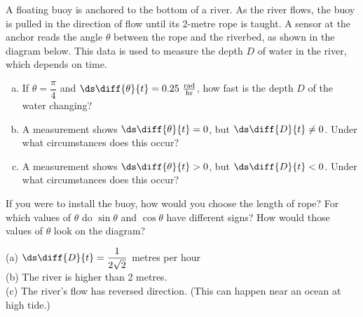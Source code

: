 \begin{Mquestion}
A floating buoy is anchored to the bottom of a river. As the river flows, the buoy is pulled in the direction of flow until its 2-metre rope is taught. A sensor at the anchor reads the angle $\theta$ between the rope and the riverbed, as shown in the diagram below. This data is used to measure the depth $D$ of water in the river, which depends on time.
\begin{center}
\end{center}
\begin{enumerate}[(a)]
\item If $\theta = \dfrac{\pi}{4}$ and $\ds\diff{\theta}{t}=0.25~\frac{\mathrm{rad}}{\mathrm{hr}}$, how fast is the depth $D$ of the water changing?
\item A measurement shows $\ds\diff{\theta}{t}=0$, but $\ds\diff{D}{t}\neq0$. Under what circumstances does this occur?
\item A measurement shows $\ds\diff{\theta}{t}>0$, but $\ds\diff{D}{t}<0$. Under what circumstances does this occur?
\end{enumerate}
\end{Mquestion}
\begin{hint}
If you were to install the buoy, how would you choose the length of rope? For which values of $\theta$ do $\sin\theta$ and $\cos\theta$ have different signs? How would those values of $\theta$ look on the diagram?
\end{hint}
\begin{answer}
(a) $\ds\diff{D}{t}=\dfrac{1}{2\sqrt{2}}$ metres per hour\\
(b) The river is higher than 2 metres.\\
(c) The river's flow has reversed direction. (This can happen near an ocean at high tide.)
\end{answer}
